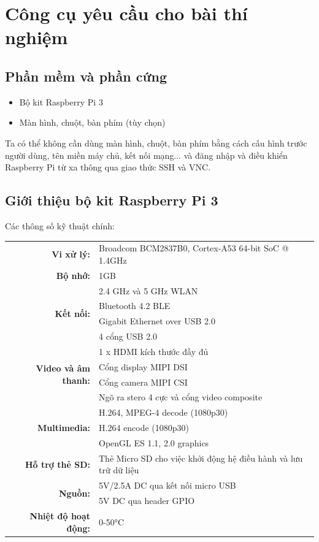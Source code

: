 \section{Công cụ yêu cầu cho bài thí nghiệm}

\subsection{Phần mềm và phần cứng}

\begin{itemize}
    \item Bộ kit Raspberry Pi 3
    \item Màn hình, chuột, bàn phím (tùy chọn)
\end{itemize}

Ta có thể không cần dùng màn hình, chuột, bàn phím bằng cách cấu hình trước người dùng, tên miền máy chủ, kết nối mạng... và đăng nhập và điều khiển Raspberry Pi từ xa thông qua giao thức SSH và VNC.

\subsection{Giới thiệu bộ kit Raspberry Pi 3}

Các thông số kỹ thuật chính:

{ \centering
\begin{longtable}{rl}
\textbf{Vi xử lý:} & Broadcom BCM2837B0, Cortex-A53 64-bit SoC @ 1.4GHz \\
\textbf{Bộ nhớ:} & 1GB \\
\multirow{4}{*}{\textbf{Kết nối:}} & 2.4 GHz và 5 GHz WLAN \\
 & Bluetooth 4.2 BLE \\
 & Gigabit Ethernet over USB 2.0 \\
 & 4 cổng USB 2.0 \\
\multirow{4}{*}{\textbf{Video và âm thanh:}} & 1 x HDMI kích thước đầy đủ \\
 & Cổng display MIPI DSI \\
 & Cổng camera MIPI CSI \\
 & Ngõ ra stero 4 cực và cổng video composite \\
\multirow{3}{*}{\textbf{Multimedia:}} & H.264, MPEG-4 decode (1080p30) \\
 & H.264 encode (1080p30) \\
 & OpenGL ES 1.1, 2.0 graphics \\
\textbf{Hỗ trợ thẻ SD:} & Thẻ Micro SD cho việc khởi động hệ điều hành và lưu trữ dữ liệu \\
\multirow{2}{*}{\textbf{Nguồn:}} & 5V/2.5A DC qua kết nối micro USB \\
 & 5V DC qua header GPIO \\
\textbf{Nhiệt độ hoạt động:} & 0-50°C
\end{longtable}
}

